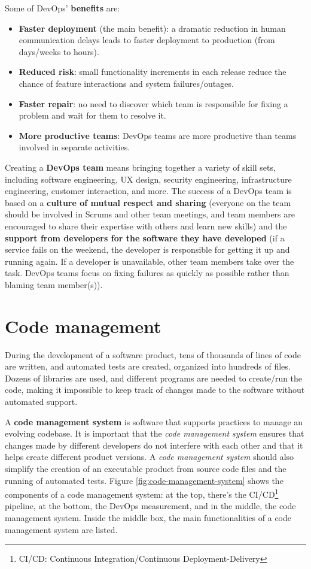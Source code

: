 \newpage
\noindent Some of DevOps' \textbf{benefits} are:

\begin{itemize}
    \item \textbf{Faster deployment} (the main benefit): a dramatic reduction in human communication delays leads to faster deployment to production (from days/weeks to hours).
    \item \textbf{Reduced risk}: small functionality increments in each release reduce the chance of feature interactions and system failures/outages.
    \item \textbf{Faster repair}: no need to discover which team is responsible for fixing a problem and wait for them to resolve it.
    \item \textbf{More productive teams}: DevOps teams are more productive than teams involved in separate activities.
\end{itemize}

Creating a \textbf{DevOps team} means bringing together a variety of skill sets, including software engineering, UX design, security engineering, infrastructure engineering, customer interaction, and more. The success of a DevOps team is based on a \textbf{culture of mutual respect and sharing} (everyone on the team should be involved in Scrums and other team meetings, and team members are encouraged to share their expertise with others and learn new skills) and the \textbf{support from developers for the software they have developed} (if a service fails on the weekend, the developer is responsible for getting it up and running again. If a developer is unavailable, other team members take over the task. DevOps teams focus on fixing failures as quickly as possible rather than blaming team member(s)).

\section{Code management}

During the development of a software product, tens of thousands of lines of code are written, and automated tests are created, organized into hundreds of files. Dozens of libraries are used, and different programs are needed to create/run the code, making it impossible to keep track of changes made to the software without automated support.

A \textbf{code management system} is software that supports practices to manage an evolving codebase. It is important that the \textit{code management system} ensures that changes made by different developers do not interfere with each other and that it helps create different product versions. A \textit{code management system} should also simplify the creation of an executable product from source code files and the running of automated tests. Figure \ref{fig:code-management-system} shows the components of a code management system: at the top, there's the CI/CD\footnote{CI/CD: Continuous Integration/Continuous Deployment-Delivery} pipeline, at the bottom, the DevOps measurement, and in the middle, the code management system. Inside the middle box, the main functionalities of a code management system are listed.

